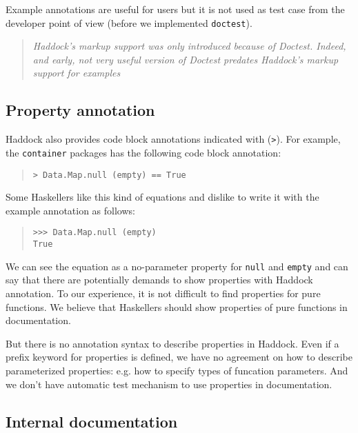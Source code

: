 \documentclass[preprint]{sigplanconf}
\begin{document}
\noindent Example annotations are useful for users but 
it is not used as test case from the developer point of view (before we implemented {\tt doctest}).

\begin{quote}
    \emph{Haddock's markup support was only introduced because of Doctest.
    Indeed, and early, not very useful version of Doctest predates Haddock's
    markup support for examples}
\end{quote}

\subsection{Property annotation}

Haddock also provides code block annotations indicated with ({\tt >}).
For example, the {\tt container} packages has the following code block annotation:

\begin{quote}
\begin{verbatim}
> Data.Map.null (empty) == True
\end{verbatim}
\end{quote}

\noindent Some Haskellers like this kind of equations and dislike to write it with the example annotation as follows:

\begin{quote}
\begin{verbatim}
>>> Data.Map.null (empty)
True
\end{verbatim}
\end{quote}

We can see the equation as a no-parameter property for {\tt null} and {\tt empty} and
can say that there are potentially demands to show properties with Haddock annotation.
To our experience, it is not difficult to find properties for pure functions.
We believe that Haskellers should show properties of pure functions
in documentation.

But there is no annotation syntax to describe properties in Haddock.
Even if a prefix keyword for properties is defined, 
we have no agreement on how to describe parameterized properties: e.g. how to specify types of funcation parameters. And we don't have automatic test mechanism to use properties in documentation.

\subsection{Internal documentation}
\end{document}
